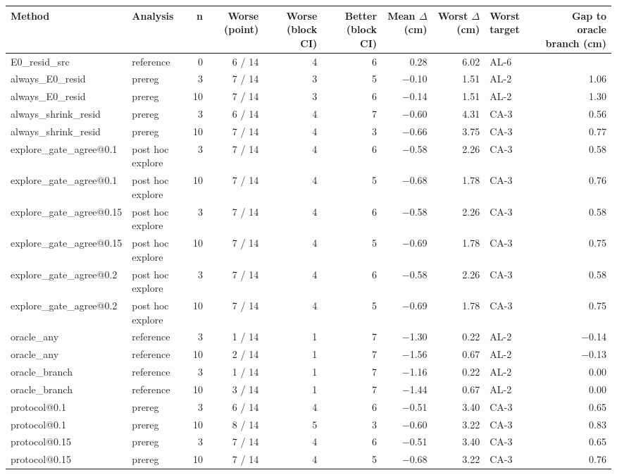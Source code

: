 \begin{tabular}{llrrrrrrlr}
\toprule
Method & Analysis & n & Worse (point) & Worse (block CI) & Better (block CI) & Mean $\Delta$ (cm) & Worst $\Delta$ (cm) & Worst target & Gap to oracle branch (cm) \\
\midrule
E0\_resid\_src & reference & 0 & 6 / 14 & 4 & 6 & 0.28 & 6.02 & AL-6 &  \\
always\_E0\_resid & prereg & 3 & 7 / 14 & 3 & 5 & $-$0.10 & 1.51 & AL-2 & 1.06 \\
always\_E0\_resid & prereg & 10 & 7 / 14 & 3 & 6 & $-$0.14 & 1.51 & AL-2 & 1.30 \\
always\_shrink\_resid & prereg & 3 & 6 / 14 & 4 & 7 & $-$0.60 & 4.31 & CA-3 & 0.56 \\
always\_shrink\_resid & prereg & 10 & 7 / 14 & 4 & 3 & $-$0.66 & 3.75 & CA-3 & 0.77 \\
explore\_gate\_agree@0.1 & post hoc explore & 3 & 7 / 14 & 4 & 6 & $-$0.58 & 2.26 & CA-3 & 0.58 \\
explore\_gate\_agree@0.1 & post hoc explore & 10 & 7 / 14 & 4 & 5 & $-$0.68 & 1.78 & CA-3 & 0.76 \\
explore\_gate\_agree@0.15 & post hoc explore & 3 & 7 / 14 & 4 & 6 & $-$0.58 & 2.26 & CA-3 & 0.58 \\
explore\_gate\_agree@0.15 & post hoc explore & 10 & 7 / 14 & 4 & 5 & $-$0.69 & 1.78 & CA-3 & 0.75 \\
explore\_gate\_agree@0.2 & post hoc explore & 3 & 7 / 14 & 4 & 6 & $-$0.58 & 2.26 & CA-3 & 0.58 \\
explore\_gate\_agree@0.2 & post hoc explore & 10 & 7 / 14 & 4 & 5 & $-$0.69 & 1.78 & CA-3 & 0.75 \\
oracle\_any & reference & 3 & 1 / 14 & 1 & 7 & $-$1.30 & 0.22 & AL-2 & $-$0.14 \\
oracle\_any & reference & 10 & 2 / 14 & 1 & 7 & $-$1.56 & 0.67 & AL-2 & $-$0.13 \\
oracle\_branch & reference & 3 & 1 / 14 & 1 & 7 & $-$1.16 & 0.22 & AL-2 & 0.00 \\
oracle\_branch & reference & 10 & 3 / 14 & 1 & 7 & $-$1.44 & 0.67 & AL-2 & 0.00 \\
protocol@0.1 & prereg & 3 & 6 / 14 & 4 & 6 & $-$0.51 & 3.40 & CA-3 & 0.65 \\
protocol@0.1 & prereg & 10 & 8 / 14 & 5 & 3 & $-$0.60 & 3.22 & CA-3 & 0.83 \\
protocol@0.15 & prereg & 3 & 7 / 14 & 4 & 6 & $-$0.51 & 3.40 & CA-3 & 0.65 \\
protocol@0.15 & prereg & 10 & 7 / 14 & 4 & 5 & $-$0.68 & 3.22 & CA-3 & 0.76 \\

\end{tabular}

